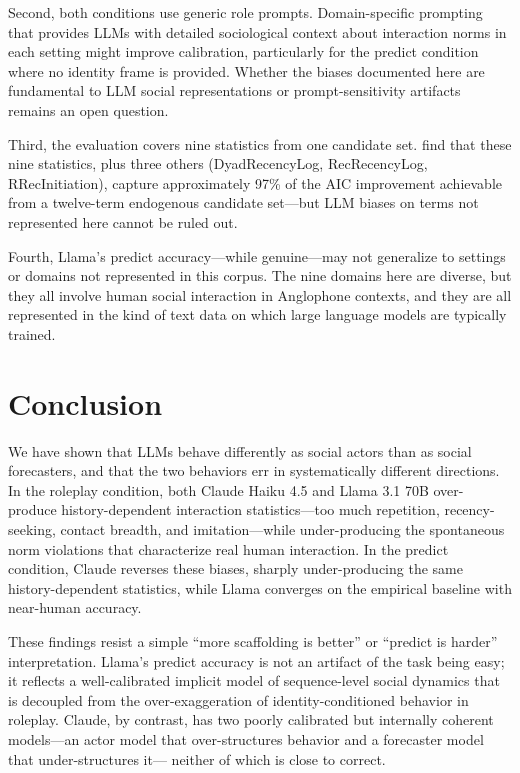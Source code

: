 \documentclass[11pt]{article}
\begin{document}
Second, both conditions use generic role prompts. Domain-specific prompting
that provides LLMs with detailed sociological context about interaction
norms in each setting might improve calibration, particularly for the
predict condition where no identity frame is provided. Whether the biases
documented here are fundamental to LLM social representations or
prompt-sensitivity artifacts remains an open question.

Third, the evaluation covers nine statistics from one candidate set.
\citet{gibson2025four} find that these nine statistics, plus three others
(DyadRecencyLog, RecRecencyLog, RRecInitiation), capture approximately 97\%
of the AIC improvement achievable from a twelve-term endogenous candidate
set---but LLM biases on terms not represented here cannot be ruled out.

Fourth, Llama's predict accuracy---while genuine---may not generalize to
settings or domains not represented in this corpus. The nine domains here
are diverse, but they all involve human social interaction in Anglophone
contexts, and they are all represented in the kind of text data on which
large language models are typically trained.

\section{Conclusion}

We have shown that LLMs behave differently as social actors than as social
forecasters, and that the two behaviors err in systematically different
directions. In the roleplay condition, both Claude Haiku 4.5 and Llama 3.1
70B over-produce history-dependent interaction statistics---too much
repetition, recency-seeking, contact breadth, and imitation---while
under-producing the spontaneous norm violations that characterize real
human interaction. In the predict condition, Claude reverses these biases,
sharply under-producing the same history-dependent statistics, while Llama
converges on the empirical baseline with near-human accuracy.

These findings resist a simple ``more scaffolding is better'' or ``predict
is harder'' interpretation. Llama's predict accuracy is not an artifact of
the task being easy; it reflects a well-calibrated implicit model of
sequence-level social dynamics that is decoupled from the over-exaggeration
of identity-conditioned behavior in roleplay. Claude, by contrast, has two
poorly calibrated but internally coherent models---an actor model that
over-structures behavior and a forecaster model that under-structures it---
neither of which is close to correct.
\end{document}
